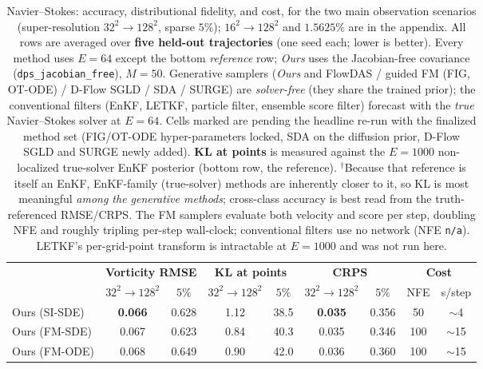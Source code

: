 \begin{table}[ht]
    \centering
    \small
    \caption{Navier--Stokes: accuracy, distributional fidelity, and cost, for the two main observation scenarios (super-resolution $32^2\!\to\!128^2$, sparse $5\%$); $16^2\!\to\!128^2$ and $1.5625\%$ are in the appendix. All rows are averaged over \textbf{five held-out trajectories} (one seed each; lower is better). Every method uses $E=64$ except the bottom \emph{reference} row; \emph{Ours} uses the Jacobian-free covariance (\texttt{dps\_jacobian\_free}), $M=50$. Generative samplers (\emph{Ours} and FlowDAS / guided FM (FIG, OT-ODE) / D-Flow SGLD / SDA / SURGE) are \emph{solver-free} (they share the trained prior); the conventional filters (EnKF, LETKF, particle filter, ensemble score filter) forecast with the \emph{true} Navier--Stokes solver at $E=64$. Cells marked \tbd{} are pending the headline re-run with the finalized method set (FIG/OT-ODE hyper-parameters locked, SDA on the diffusion prior, D-Flow SGLD and SURGE newly added). \textbf{KL at points} is measured against the $E=1000$ non-localized true-solver EnKF posterior (bottom row, the reference). $^\dagger$Because that reference is itself an EnKF, EnKF-family (true-solver) methods are inherently closer to it, so KL is most meaningful \emph{among the generative methods}; cross-class accuracy is best read from the truth-referenced RMSE/CRPS. The FM samplers evaluate both velocity and score per step, doubling NFE and roughly tripling per-step wall-clock; conventional filters use no network (NFE \texttt{n/a}). LETKF's per-grid-point transform is intractable at $E=1000$ and was not run here.}
    \label{tab:ns_accuracy}
    \begin{tabular}{l|cc|cc|cc|cc}
        \toprule
        & \multicolumn{2}{c|}{\textbf{Vorticity RMSE}}
        & \multicolumn{2}{c|}{\textbf{KL at points}}
        & \multicolumn{2}{c|}{\textbf{CRPS}}
        & \multicolumn{2}{c}{\textbf{Cost}} \\
        & $32^2\!\to\!128^2$ & $5\%$ & $32^2\!\to\!128^2$ & $5\%$ & $32^2\!\to\!128^2$ & $5\%$ & NFE & s/step \\
        \midrule
        Ours (SI-SDE) & \textbf{0.066} & 0.628 & 1.12 & 38.5 & \textbf{0.035} & 0.356 & 50 & $\sim$4 \\
        Ours (FM-SDE) & 0.067 & 0.623 & 0.84 & 40.3 & 0.035 & 0.346 & 100 & $\sim$15 \\
        Ours (FM-ODE) & 0.068 & 0.649 & 0.90 & 42.0 & 0.036 & 0.360 & 100 & $\sim$15 \\
        \midrule

\end{tabular}
\end{table}

